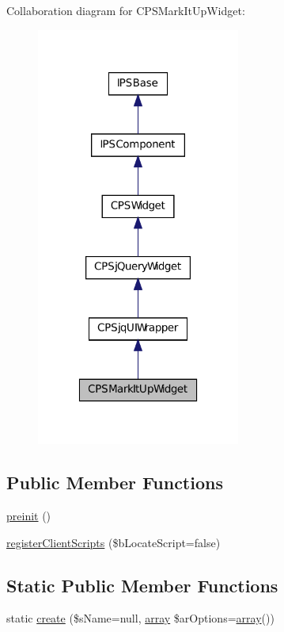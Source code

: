 Collaboration diagram for CPSMarkItUpWidget:\nopagebreak
\begin{figure}[H]
\begin{center}
\leavevmode
\includegraphics[width=190pt]{classCPSMarkItUpWidget__coll__graph}
\end{center}
\end{figure}
\subsection*{Public Member Functions}
\begin{DoxyCompactItemize}
\item 
\hyperlink{classCPSMarkItUpWidget_a2dc262e99b1c246b56f27626bfe699ff}{preinit} ()
\item 
\hyperlink{classCPSMarkItUpWidget_ac02a66bde8e72e4909137bf748edf665}{registerClientScripts} (\$bLocateScript=false)
\end{DoxyCompactItemize}
\subsection*{Static Public Member Functions}
\begin{DoxyCompactItemize}
\item 
static \hyperlink{classCPSMarkItUpWidget_a0ffc269a208148ade57c7eb608a4562a}{create} (\$sName=null, \hyperlink{list_8php_aa3205d038c7f8feb5c9f01ac4dfadc88}{array} \$arOptions=\hyperlink{list_8php_aa3205d038c7f8feb5c9f01ac4dfadc88}{array}())
\end{DoxyCompactItemize}
